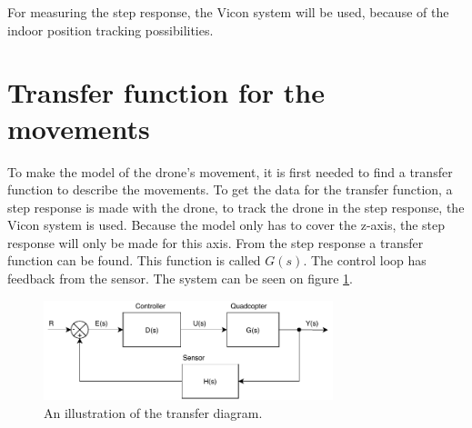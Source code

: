 For measuring the step response, the Vicon system will be used, because of the indoor position tracking possibilities.


\section{Transfer function for the movements}\label{s:transfer_function}
To make the model of the drone's movement, it is first needed to find a transfer function to describe the movements. To get the data for the transfer function, a step response is made with the drone, to track the drone in the step response, the Vicon system is used. Because the model only has to cover the z-axis, the step response will only be made for this axis. From the step response a transfer function can be found. This function is called $G(s)$. 
The control loop has feedback from the sensor. The system can be seen on figure \ref{fig:transfer_function}.
\begin{figure}[H]
    \centering
    \includegraphics[width=0.75\textwidth]{figures/ch_design/transfer_function.pdf}
    \caption{An illustration of the transfer diagram.}
    \label{fig:transfer_function}
\end{figure}

